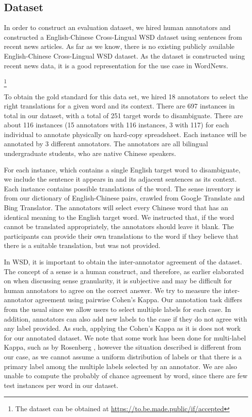 \subsection{Dataset}
In order to construct an evaluation dataset, we hired human annotators and constructed a English-Chinese Cross-Lingual WSD dataset using sentences from recent news articles. As far as we know, there is no existing publicly available English-Chinese Cross-Lingual WSD dataset. As the dataset is constructed using recent news data, it is a good representation for the use case in WordNews. {\footnote{The dataset can be obtained at %
{\url{https://to.be.made.public/if/accepted}}}

To obtain the gold standard for this data set, we hired 18 annotators to select the right translations for a given word and its context. There are 697 instances in total in our dataset, with a total of 251 target words to disambiguate. There are about 116 instances (15 annotators with 116 instances, 3 with 117) for each individual to annotate physically on hard-copy spreadsheet. Each instance will be annotated by 3 different annotators. The annotators are all bilingual undergraduate students, who are native Chinese speakers. 

For each instance, which contains a single English target word to disambiguate, we include the sentence it appears in and its adjacent sentences as its context. Each instance contains possible translations of the word. The sense inventory is from our dictionary of English-Chinese pairs, crawled from Google Translate and Bing Translator. The annotators will select every Chinese word that has an identical meaning to the English target word. We instructed that, if the word cannot be translated appropriately, the annotators should leave it blank. The participants can provide their own translations to the word if they believe that there is a suitable translation, but was not provided. 


In WSD, it is important to obtain the inter-annotator agreement of the dataset. The concept of a sense is a human construct, and therefore, as earlier elaborated on when discussing sense granularity, it is subjective and may be difficult for human annotators to agree on the correct answer. We try to measure the inter-annotator agreement using pairwise Cohen's Kappa. Our annotation task differs from the usual since we allow users to select multiple labels for each case. In addition, annotators can also add new labels to the case if they do not agree with any label provided. As such, applying the Cohen's Kappa as it is does not work for our annotated dataset. We note that some work has been done for multi-label Kappa, such as by Rosenberg , however the situation described  is different from our case, as we cannot assume a uniform distribution of labels or that there is a primary label among the multiple labels selected by an annotator. We are also unable to compute the probably of chance agreement by word, since there are few test instances per word in our dataset.

}
